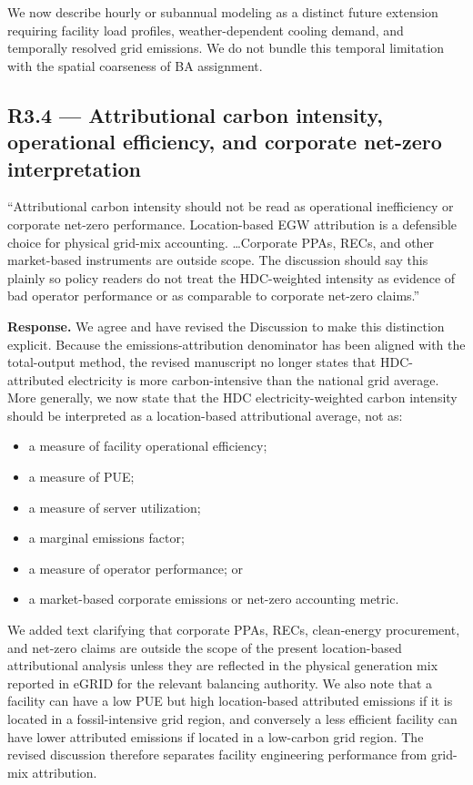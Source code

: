 \documentclass[11pt]{article}
\newenvironment{revquote}{%
  \begin{mdframed}[
    leftmargin=0.5em,
    rightmargin=0.5em,
    linewidth=0pt,
    backgroundcolor=gray!8,
    skipabove=0.5em,
    skipbelow=0.5em,
    innertopmargin=0.6em,
    innerbottommargin=0.6em,
    innerleftmargin=0.8em,
    innerrightmargin=0.8em
  ]%
  \itshape%
}{%
  \end{mdframed}%
}
\begin{document}
We now describe hourly or subannual modeling as a distinct future extension requiring facility load profiles, weather-dependent cooling demand, and temporally resolved grid emissions. We do not bundle this temporal limitation with the spatial coarseness of BA assignment.

\subsection*{R3.4 --- Attributional carbon intensity, operational efficiency, and corporate net-zero interpretation}

\begin{revquote}
``Attributional carbon intensity should not be read as operational inefficiency or corporate net-zero performance. Location-based EGW attribution is a defensible choice for physical grid-mix accounting. \ldots Corporate PPAs, RECs, and other market-based instruments are outside scope. The discussion should say this plainly so policy readers do not treat the HDC-weighted intensity as evidence of bad operator performance or as comparable to corporate net-zero claims.''
\end{revquote}

\textbf{Response.} We agree and have revised the Discussion to make this distinction explicit. Because the emissions-attribution denominator has been aligned with the total-output method, the revised manuscript no longer states that HDC-attributed electricity is more carbon-intensive than the national grid average. More generally, we now state that the HDC electricity-weighted carbon intensity should be interpreted as a location-based attributional average, not as:

\begin{itemize}
    \item a measure of facility operational efficiency;
    \item a measure of PUE;
    \item a measure of server utilization;
    \item a marginal emissions factor;
    \item a measure of operator performance; or
    \item a market-based corporate emissions or net-zero accounting metric.
\end{itemize}

We added text clarifying that corporate PPAs, RECs, clean-energy procurement, and net-zero claims are outside the scope of the present location-based attributional analysis unless they are reflected in the physical generation mix reported in eGRID for the relevant balancing authority. We also note that a facility can have a low PUE but high location-based attributed emissions if it is located in a fossil-intensive grid region, and conversely a less efficient facility can have lower attributed emissions if located in a low-carbon grid region. The revised discussion therefore separates facility engineering performance from grid-mix attribution.
\end{document}
